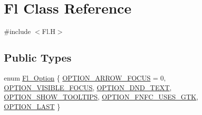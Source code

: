 \hypertarget{class_fl}{}\section{Fl Class Reference}
\label{class_fl}


{\ttfamily \#include $<$Fl.\+H$>$}

\subsection*{Public Types}
\begin{DoxyCompactItemize}
\item 
enum \hyperlink{class_fl_a43e6e0bbbc03cad134d928d4edd48d1d}{Fl\+\_\+\+Option} \{ \newline
\hyperlink{class_fl_a43e6e0bbbc03cad134d928d4edd48d1da0d10867528510b82613c085e6240ebf6}{O\+P\+T\+I\+O\+N\+\_\+\+A\+R\+R\+O\+W\+\_\+\+F\+O\+C\+US} = 0, 
\hyperlink{class_fl_a43e6e0bbbc03cad134d928d4edd48d1dade29f22fc8066222d99ea3ccebc5e655}{O\+P\+T\+I\+O\+N\+\_\+\+V\+I\+S\+I\+B\+L\+E\+\_\+\+F\+O\+C\+US}, 
\hyperlink{class_fl_a43e6e0bbbc03cad134d928d4edd48d1da2344bf14f80ecf5971e8aa4493a3858a}{O\+P\+T\+I\+O\+N\+\_\+\+D\+N\+D\+\_\+\+T\+E\+XT}, 
\hyperlink{class_fl_a43e6e0bbbc03cad134d928d4edd48d1dae8214e42f77fe157297d61fdb818be2f}{O\+P\+T\+I\+O\+N\+\_\+\+S\+H\+O\+W\+\_\+\+T\+O\+O\+L\+T\+I\+PS}, 
\newline
\hyperlink{class_fl_a43e6e0bbbc03cad134d928d4edd48d1da01d530d6bc747eb0c192038eb802a8bd}{O\+P\+T\+I\+O\+N\+\_\+\+F\+N\+F\+C\+\_\+\+U\+S\+E\+S\+\_\+\+G\+TK}, 
\hyperlink{class_fl_a43e6e0bbbc03cad134d928d4edd48d1da220ebf62255fc47e5b5f213b410e2bc5}{O\+P\+T\+I\+O\+N\+\_\+\+L\+A\+ST}
 \}
\end{DoxyCompactItemize}

